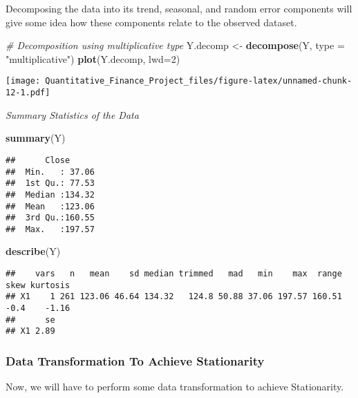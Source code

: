 \documentclass[
]{article}
\newenvironment{Shaded}{\begin{snugshade}}{\end{snugshade}}
\newcommand{\AttributeTok}[1]{\textcolor[rgb]{0.13,0.29,0.53}{#1}}
\newcommand{\CommentTok}[1]{\textcolor[rgb]{0.56,0.35,0.01}{\textit{#1}}}
\newcommand{\DecValTok}[1]{\textcolor[rgb]{0.00,0.00,0.81}{#1}}
\newcommand{\FunctionTok}[1]{\textcolor[rgb]{0.13,0.29,0.53}{\textbf{#1}}}
\newcommand{\NormalTok}[1]{#1}
\newcommand{\OtherTok}[1]{\textcolor[rgb]{0.56,0.35,0.01}{#1}}
\newcommand{\StringTok}[1]{\textcolor[rgb]{0.31,0.60,0.02}{#1}}
\begin{document}
Decomposing the data into its trend, seasonal, and random error
components will give some idea how these components relate to the
observed dataset.

\begin{Shaded}
\begin{Highlighting}[]
\CommentTok{\# Decomposition using multiplicative type }
\NormalTok{Y.decomp }\OtherTok{\textless{}{-}} \FunctionTok{decompose}\NormalTok{(Y, }\AttributeTok{type =} \StringTok{"multiplicative"}\NormalTok{)}
\FunctionTok{plot}\NormalTok{(Y.decomp, }\AttributeTok{lwd=}\DecValTok{2}\NormalTok{)}
\end{Highlighting}
\end{Shaded}

\texttt{[image: Quantitative\_Finance\_Project\_files/figure-latex/unnamed-chunk-12-1.pdf]}

\emph{Summary Statistics of the Data}

\begin{Shaded}
\begin{Highlighting}[]
\FunctionTok{summary}\NormalTok{(Y)}
\end{Highlighting}
\end{Shaded}

\begin{verbatim}
##      Close       
##  Min.   : 37.06  
##  1st Qu.: 77.53  
##  Median :134.32  
##  Mean   :123.06  
##  3rd Qu.:160.55  
##  Max.   :197.57
\end{verbatim}

\begin{Shaded}
\begin{Highlighting}[]
\FunctionTok{describe}\NormalTok{(Y)}
\end{Highlighting}
\end{Shaded}

\begin{verbatim}
##    vars   n   mean    sd median trimmed   mad   min    max  range skew kurtosis
## X1    1 261 123.06 46.64 134.32   124.8 50.88 37.06 197.57 160.51 -0.4    -1.16
##      se
## X1 2.89
\end{verbatim}

\hypertarget{data-transformation-to-achieve-stationarity-1}{%
\subsubsection{Data Transformation To Achieve
Stationarity}\label{data-transformation-to-achieve-stationarity-1}}

Now, we will have to perform some data transformation to achieve
Stationarity.
\end{document}
